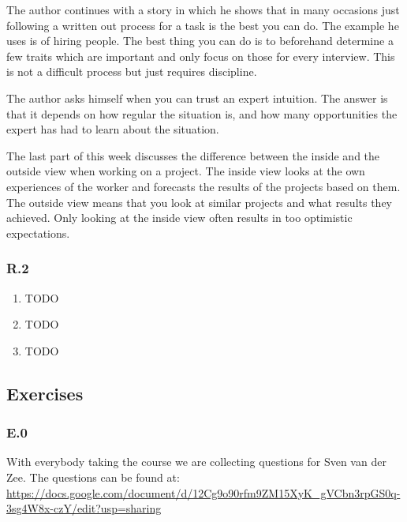 \documentclass[]{article}
\begin{document}
The author continues with a story in which he shows that in many occasions just 
following a written out process for a task is the best you can do. The example 
he uses is of hiring people. The best thing you can do is to beforehand determine 
a few traits which are important and only focus on those for every interview. 
This is not a difficult process but just requires discipline.

The author asks himself when you can trust an expert intuition. The answer is 
that it depends on how regular the situation is, and how many opportunities the 
expert has had to learn about the situation.

The last part of this week discusses the difference between the inside and the 
outside view when working on a project. The inside view looks at the own 
experiences of the worker and forecasts the results of the projects based on 
them. The outside view means that you look at similar projects and what results 
they achieved. Only looking at the inside view often results in too optimistic
expectations.

\subsubsection*{R.2} 
\begin{enumerate}[a]
    \item TODO
    \item TODO
    \item TODO
\end{enumerate}


\subsection*{Exercises} 

\subsubsection*{E.0}
With everybody taking the course we are collecting questions for Sven van der Zee.
The questions can be found at: \url{https://docs.google.com/document/d/12Cg9o90rfm9ZM15XyK_gVCbn3rpGS0q-3sg4W8x-czY/edit?usp=sharing}
\end{document}
